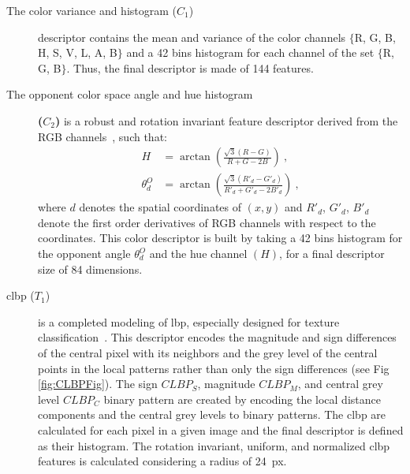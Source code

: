 \begin{description}
\item[The color variance and histogram ($C_{1}$)] descriptor contains the mean and variance of the color channels $\{$R, G, B, H, S, V, L, A, B$\}$ and a 42 bins histogram for each channel of the set $\{$R, G, B$\}$. Thus, the final descriptor is made of 144 features.
\item[The opponent color space angle and hue histogram] \textbf{($C_{2}$)} is a robust and rotation invariant feature descriptor derived from the RGB channels~\cite{van2006coloring}, such that:
  \begin{align}\label{Eq:AngO}
    H &= \arctan\left(\frac{\sqrt{3}\left(R-G\right)}{R+G-2B}\right) \ , \nonumber \\
    \theta^{O}_{d} &= \arctan \left( \frac{\sqrt{3}\left(R'_{d}-G'_{d}\right)}{R'_{d}+G'_{d}-2B'_{d}}\right) \ ,
  \end{align}
\noindent where $d$ denotes the spatial coordinates of $(x,y)$ and $R'_{d}$, $G'_{d}$, $B'_{d}$ denote the first order derivatives of RGB channels with respect to the coordinates. 
This color descriptor is built by taking a 42 bins histogram for the opponent angle $\theta^{O}_{d}$ and the hue channel $(H)$, for a final descriptor size of 84 dimensions.
\item[\ac{clbp} ($T_{1}$)] is a completed modeling of \Ac{lbp}, especially designed for texture classification~\cite{guo2010completed}. 
This descriptor encodes the magnitude and sign differences of the central pixel with its neighbors and the grey level of the central points in the local patterns rather than only the sign differences (see Fig\,\ref{fig:CLBPFig}). 
The sign $CLBP_S$, magnitude $CLBP_M$, and central grey level $CLBP_C$ binary pattern are created by encoding the local distance components and the central grey levels to binary patterns.  
The \ac{clbp} are calculated for each pixel in a given image and the final descriptor is defined as their histogram.
The rotation invariant, uniform, and normalized \ac{clbp} features is calculated considering a radius of \SI{24}{px}.


\end{description}
